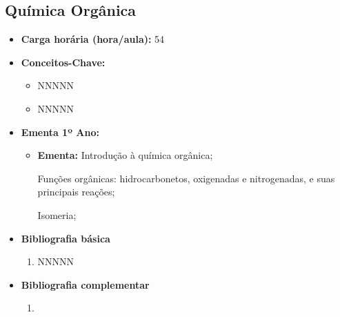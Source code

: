 \documentclass[11pt,fleqn]{book} %
\begin{document}
\subsection{Química Orgânica}\label{disc:quimica_organica}
\begin{itemize}
	\item \textbf{Carga horária (hora/aula):} 54
	\item \textbf{Conceitos-Chave:}
	\begin{itemize}
		\item NNNNN
		\item NNNNN
	\end{itemize}
	\item \textbf{Ementa 1º Ano:}
	\begin{itemize}	
		\item \textbf{Ementa:} 
		Introdução à química orgânica;
		
		Funções orgânicas: hidrocarbonetos, oxigenadas e nitrogenadas, e suas principais reações; 

		Isomeria;
	\end{itemize}
	\item \textbf{Bibliografia básica}
	\begin{enumerate}
		\item NNNNN
	\end{enumerate}
	\item \textbf{Bibliografia complementar}
	\begin{enumerate}
		\item 
	\end{enumerate}	
\end{itemize}

\newpage
\end{document}
